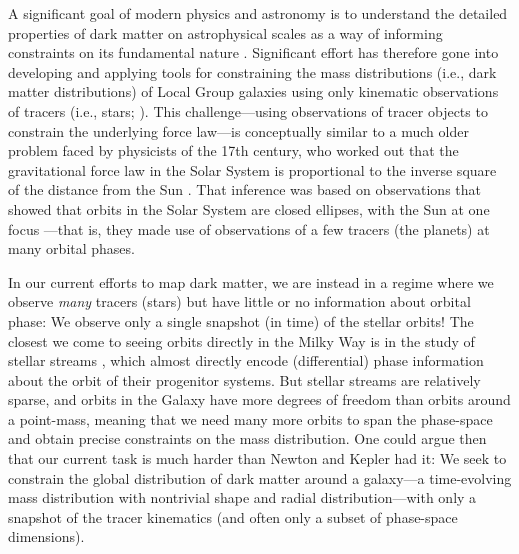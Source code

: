 \documentclass[modern]{aastex63}
\begin{document}

A significant goal of modern physics and astronomy is to understand the detailed
properties of dark matter on astrophysical scales as a way of informing
constraints on its fundamental nature \citep[see, e.g., recent reviews
by][]{Bullock:2017, Buckley:2018}.
Significant effort has therefore gone into developing and applying tools for
constraining the mass distributions (i.e., dark matter distributions) of Local
Group galaxies using only kinematic observations of tracers (i.e., stars;
\citealt{Jeans, Binney:2008, somanythings}).
This challenge---using observations of tracer objects to constrain the
underlying force law---is conceptually similar to a much older problem faced by
physicists of the 17th century, who worked out that the gravitational force law
in the Solar System is proportional to the inverse square of the distance from
the Sun \citep{Newton:1687}.
That inference was based on observations that showed that orbits in the Solar
System are closed ellipses, with the Sun at one focus \citep{Kepler:1609}---that
is, they made use of observations of a few tracers (the planets) at many orbital
phases.

In our current efforts to map dark matter, we are instead in a regime where we
observe \emph{many} tracers (stars) but have little or no information about
orbital phase: We observe only a single snapshot (in time) of the stellar
orbits!
The closest we come to seeing orbits directly in the Milky Way is in the study
of stellar streams \citep[e.g.,][]{peoples}, which almost directly encode
(differential) phase information about the orbit of their progenitor systems.
But stellar streams are relatively sparse, and orbits in the Galaxy have more
degrees of freedom than orbits around a point-mass, meaning that we need many
more orbits to span the phase-space and obtain precise constraints on the mass
distribution.
One could argue then that our current task is much harder than Newton and Kepler
had it:
We seek to constrain the global distribution of dark matter around a galaxy---a
time-evolving mass distribution with nontrivial shape and radial
distribution---with only a snapshot of the tracer kinematics (and often only a
subset of phase-space dimensions).
\end{document}
